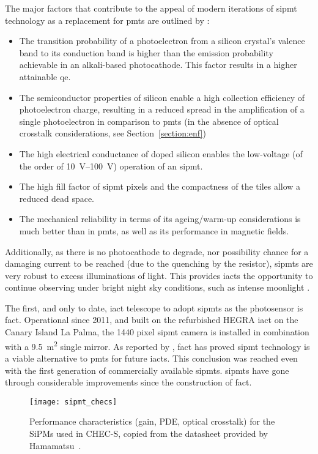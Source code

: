 The major factors that contribute to the appeal of modern iterations of \gls{sipmt} technology as a replacement for \glspl{pmt} are outlined by \textcite{Ghassemi2017}:
\begin{itemize}
\item The transition probability of a photoelectron from a silicon crystal’s valence band to its conduction band is higher than the emission probability achievable in an alkali-based photocathode. This factor results in a higher attainable \gls{qe}. 
\item The semiconductor properties of silicon enable a high collection efficiency of photoelectron charge, resulting in a reduced spread in the amplification of a single photoelectron in comparison to \glspl{pmt} (in the absence of optical crosstalk considerations, see Section~\ref{section:enf})
\item The high electrical conductance of doped silicon enables the low-voltage (of the order of \SIrange{10}{100}{V}) operation of an \gls{sipmt}.
\item The high fill factor of \gls{sipmt} pixels and the compactness of the tiles allow a reduced dead space.
\item The mechanical reliability in terms of its ageing/warm-up considerations is much better than in \glspl{pmt}, as well as its performance in magnetic fields.
\end{itemize}

Additionally, as there is no photocathode to degrade, nor possibility chance for a damaging current to be reached (due to the quenching by the resistor), \glspl{sipmt} are very robust to excess illuminations of light. This provides \glspl{iact} the opportunity to continue observing under bright night sky conditions, such as intense moonlight \cite{Knoetig2013,Heller2017}.

The first, and only to date, \gls{iact} telescope to adopt \glspl{sipmt} as the photosensor is \gls{fact}. Operational since 2011, and built on the refurbished
HEGRA \gls{iact} on the Canary Island La Palma, the 1440 pixel \gls{sipmt} camera is installed in combination with a \SI{9.5}{m\squared} single mirror. As reported by \textcite{Biland2015}, \gls{fact} has proved \gls{sipmt} technology is a viable alternative to \glspl{pmt} for future \glspl{iact}. This conclusion was reached even with the first generation of commercially available \glspl{sipmt}. \glspl{sipmt} have gone through considerable improvements since the construction of \gls{fact}.

\begin{figure}
	\centering
    \texttt{[image: sipmt\_checs]} 
	\caption[Performance characteristics for the SiPMs used in CHEC-S.]{Performance characteristics (gain, PDE, optical crosstalk) for the SiPMs used in CHEC-S, copied from the datasheet provided by Hamamatsu~\cite{Hamamatsu2013}.}
	\label{fig:sipmt_checs}
\end{figure}

